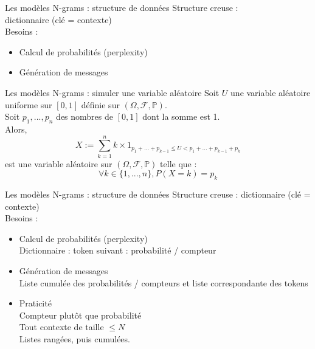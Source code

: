 \documentclass[t]{beamer}
\begin{document}
\begin{frame}{Les modèles N-grams : structure de données} %
    Structure creuse : \\
    \hspace*{0.5cm} dictionnaire (clé = contexte) \\ %
    Besoins : \\
    \begin{itemize}
        \item Calcul de probabilités (perplexity)
        \item Génération de messages
    \end{itemize}
\end{frame}

\begin{frame}{Les modèles N-grams : simuler une variable aléatoire}
    Soit $U$ une variable aléatoire uniforme sur $[0,1]$ définie sur $(\Omega, \mathcal{F}, \mathbb{P})$.\\
    {\color{white}Soit} $p_1, ..., p_n$ des nombres de $[0,1]$ dont la somme est 1. \\
    Alors, 
    $$ X := \sum_{k=1}^{n} k \times 1_{p_1 + ... + p_{k-1} \leq U < p_1 + ... + p_{k-1} + p_k} $$
    est une variable aléatoire sur $(\Omega, \mathcal{F}, \mathbb{P})$ telle que : 
    $$ \forall k \in \{1, ..., n\}, P(X=k) = p_k $$
\end{frame}

\begin{frame}{Les modèles N-grams : structure de données} %
    Structure creuse : dictionnaire (clé = contexte) \\ %
    Besoins : \\
    \begin{itemize}
        \item Calcul de probabilités (perplexity) \\
        \hspace{0.5cm} Dictionnaire : {token suivant : probabilité / compteur} 
        \item Génération de messages \\
        \hspace{0.5cm} {\small Liste cumulée des probabilités / compteurs et liste correspondante des tokens}
        \item Praticité \\
        \hspace{0.5cm} Compteur plutôt que probabilité \\ %
        \hspace{0.5cm} Tout contexte de taille $\leq N$ \\ %
        \hspace{0.5cm} Listes rangées, puis cumulées. %
    \end{itemize}
\end{frame}
\end{document}
